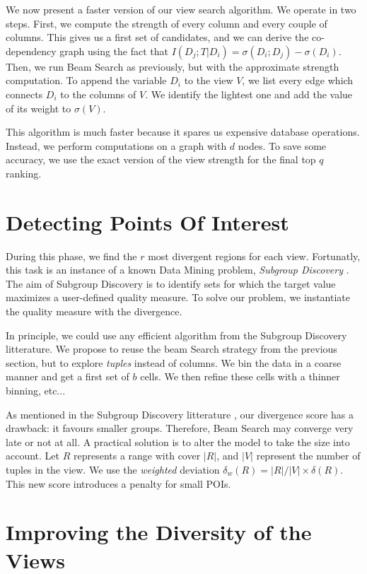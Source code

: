 We now present a faster version of our view search algorithm.  We operate in
two steps. First, we compute the strength of every column and every couple of
columns.  This gives us a first set of candidates, and we can derive the
co-dependency graph using the fact that $I(D_{j} ; T | D_i) = \sigma(D_i ;
D_{j}) - \sigma(D_i)$.  Then, we run Beam Search as previously, but with the
approximate strength computation.  To append the variable $D_i$ to the view
$V$, we list every edge which connects  $D_i$ to the columns of $V$. We
identify the lightest one and add the value of its weight to $\sigma(V)$.  

This algorithm is much faster because it spares us expensive database
operations. Instead, we perform computations on a graph with $d$ nodes.  To
save some accuracy, we use the exact version of the view strength for the final
top $q$ ranking.

\section{Detecting Points Of Interest}
\label{sec:detec}

During this phase, we find the $r$ most divergent regions for each view.
Fortunatly, this task is an instance of a known Data Mining problem,
\emph{Subgroup Discovery} \cite{klosgen1996explora}\cite{wrobel1997algorithm}.
The aim of Subgroup Discovery is to identify sets for which the target value
maximizes a user-defined quality measure. To solve our problem, we instantiate
the quality measure with the divergence.

In principle, we could use any efficient algorithm from the Subgroup Discovery
litterature.  We propose to reuse the beam Search strategy from the previous
section, but to explore \emph{tuples} instead of columns. We bin the data in a
coarse manner and get a first set of $b$ cells. We then refine these cells with
a thinner binning, etc...

As mentioned in the Subgroup Discovery litterature \cite{van2011non}, our
divergence score has a drawback: it favours smaller groups.  Therefore, Beam
Search may converge very late or not at all.  A practical
solution is to alter the model to take the size into account. Let $R$
represents a range with cover $|R|$, and $|V|$ represent the number of tuples
in the view. We use the \emph{weighted} deviation $\delta_w(R) = |R|/|V| \times
\delta(R)$. This new score introduces a penalty for small POIs.


\section{Improving the Diversity of the Views}

